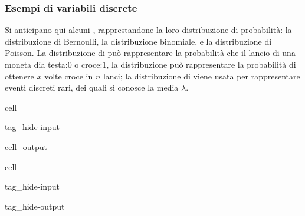 \documentclass[letterpaper,10pt,italian]{jupyterBook}
\begin{document}
\subsubsection{Esempi di variabili discrete}
\label{\detokenize{ch/statistics/random_variables_discrete:esempi-di-variabili-discrete}}
\sphinxAtStartPar
Si anticipano qui alcuni {\hyperref[\detokenize{ch/statistics/pfun_discrete_examples:statistics-hs-random-variables-discrete-examples-binomial}]{}}, rapprestandone la loro distribuzione di probabilità: la distribuzione di Bernoulli, la distribuzione binomiale, e la distribuzione di Poisson. La distribuzione di {\hyperref[\detokenize{ch/statistics/pfun_discrete_examples:statistics-hs-random-variables-discrete-examples-bernoulli}]{}} può rappresentare la probabilità che il lancio di una moneta dia testa:\(0\) o croce:\(1\), la distribuzione {\hyperref[\detokenize{ch/statistics/pfun_discrete_examples:statistics-hs-random-variables-discrete-examples-binomial}]{}} può rappresentare la probabilità di ottenere \(x\) volte croce in \(n\) lanci; la distribuzione di {\hyperref[\detokenize{ch/statistics/pfun_discrete_examples:statistics-hs-random-variables-discrete-examples-poisson}]{}} viene usata per rappresentare eventi discreti rari, dei quali si conosce la media \(\lambda\).

\begin{sphinxuseclass}{cell}
\begin{sphinxuseclass}{tag_hide-input}\begin{sphinxVerbatimOutput}

\begin{sphinxuseclass}{cell_output}
\noindent{}

\end{sphinxuseclass}\end{sphinxVerbatimOutput}

\end{sphinxuseclass}
\end{sphinxuseclass}
\begin{sphinxuseclass}{cell}
\begin{sphinxuseclass}{tag_hide-input}
\begin{sphinxuseclass}{tag_hide-output}
\end{sphinxuseclass}
\end{sphinxuseclass}
\end{sphinxuseclass}
\end{document}
